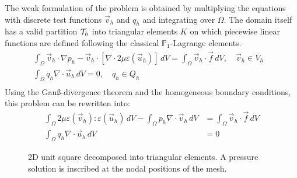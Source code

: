 The weak formulation of the problem is obtained by multiplying the equations with discrete test functions $\vec{v}_h$ and $q_h$ and integrating over $\Omega$. The domain itself has a valid partition $\mathcal{T}_h$ into triangular elements $K$ on which piecewise linear functions are defined following the classical $\mathbb{P}_1$-Lagrange elements.
\begin{equation}
	\begin{split}
		\int_\Omega \vec{v}_h\cdot\nabla p_h - \vec{v}_h\cdot\left[\nabla\cdot2\mu\varepsilon(\vec{u}_h)\right] \,dV = \int_\Omega \vec{v}_h\cdot\vec{f}\,dV, \quad \vec{v}_h \in V_h&\\
		\int_\Omega q_h\nabla \cdot \vec{u}_h\,dV = 0, \quad q_h \in Q_h&\\
	\end{split}\label{eqn:weak_stokes}
\end{equation}
Using the Gau\ss-divergence theorem and the homogeneous boundary conditions, this problem can be rewritten into:
\begin{equation}
	\begin{split}
		\int_\Omega 2\mu\varepsilon(\vec{v}_h):\varepsilon(\vec{u}_h)\,dV - \int_\Omega p_h\nabla\cdot\vec{v}_h\,dV &= \int_\Omega \vec{v}_h\cdot\vec{f}\,dV\\
		\int_\Omega q_h\nabla \cdot \vec{u}_h\,dV &= 0
	\end{split}\label{eqn:weak_stokes2}
\end{equation}

\begin{figure}[htbp]
	\centering
	
	\caption[LBB violation on a toy problem]{2D unit square decomposed into triangular elements. A pressure solution is inscribed at the nodal positions of the mesh.}\label{fig:LBB_Violation}
\end{figure}

